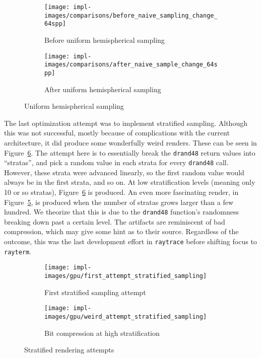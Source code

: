\vspace{0.3em}
\begin{figure}[htb]
  \centering
  \begin{subfigure}[htb]{0.45\textwidth}
    \texttt{[image: impl-images/comparisons/before\_naive\_sampling\_change\_64spp]}
    \caption{Before uniform hemispherical sampling}
\label{fig:rayterm-gpu_hemispherical_sampling_before}
  \end{subfigure}
  \begin{subfigure}[htb]{0.45\textwidth}
    \texttt{[image: impl-images/comparisons/after\_naive\_sample\_change\_64spp]}
    \caption{After uniform hemispherical sampling}
\label{fig:rayterm-gpu_hemispherical_sampling_after}
  \end{subfigure}
  \caption{Uniform hemispherical sampling}
\label{fig:rayterm-gpu_hemispherical_sampling}
\end{figure}

The last optimization attempt was to implement stratified sampling.
Although this was not successful, mostly because of complications with the current architecture, it did produce some wonderfully weird renders.
These can be seen in Figure~\ref{fig:rayterm-gpu_stratified}.
The attempt here is to essentially break the \texttt{drand48} return values into ``stratas'', and pick a random value in each strata for every \texttt{drand48} call.
However, these strata were advanced linearly, so the first random value would always be in the first strata, and so on.
At low stratification levels (meaning only 10 or so stratas), Figure~\ref{fig:rayterm-gpu_stratified} is produced.
An even more fascinating render, in Figure~\ref{fig:rayterm-gpu_bit_compression}, is produced when the number of stratas grows larger than a few hundred.
We theorize that this is due to the \texttt{drand48} function's randomness breaking down past a certain level.
The artifacts are reminiscent of bad compression, which may give some hint as to their source.
Regardless of the outcome, this was the last development effort in \texttt{raytrace} before shifting focus to \texttt{rayterm}.

\vspace{0.3em}
\begin{figure}[htb]
  \centering
  \begin{subfigure}[htb]{0.45\textwidth}
    \texttt{[image: impl-images/gpu/first\_attempt\_stratified\_sampling]}
    \caption{First stratified sampling attempt}
\label{fig:rayterm-gpu_stratified}
  \end{subfigure}
  \begin{subfigure}[htb]{0.45\textwidth}
    \texttt{[image: impl-images/gpu/weird\_attempt\_stratified\_sampling]}
    \caption{Bit compression at high stratification}
\label{fig:rayterm-gpu_bit_compression}
  \end{subfigure}
  \caption{Stratified rendering attempts}
\label{fig:rayterm-gpu_stratified}
\end{figure}

